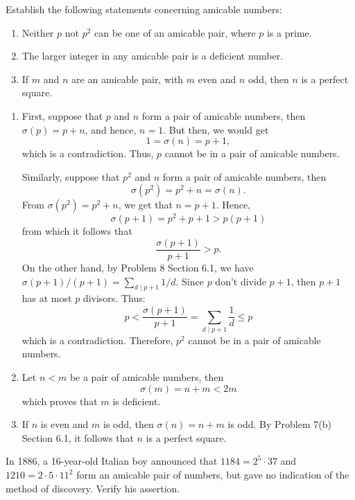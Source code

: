 \begin{exercise}
    Establish the following statements concerning amicable numbers:
    \begin{enumerate}
        \item Neither $p$ not $p^2$ can be one of an amicable pair, where $p$ is a prime.
        \item The larger integer in any amicable pair is a deficient number.
        \item If $m$ and $n$ are an amicable pair, with $m$ even and $n$ odd, then $n$ is a perfect square.  \\
    \end{enumerate}
\end{exercise}

\begin{solution}
    \begin{enumerate}
        \item First, suppose that $p$ and $n$ form a pair of amicable numbers, then
        $\sigma(p) = p + n$, and hence, $n = 1$. But then, we would get
        $$1 = \sigma(n) = p+1,$$
        which is a contradiction. Thus, $p$ cannot be in a pair of amicable numbers.

        Similarly, suppose that $p^2$ and $n$ form a pair of amicable numbers, then
        $$\sigma(p^2) = p^2 + n = \sigma(n).$$
        From $\sigma(p^2) = p^2 + n$, we get that $n = p+1$. Hence,
        $$\sigma(p + 1) = p^2 + p + 1 >p(p+1)$$
        from which it follows that
        $$\frac{\sigma(p+1)}{p+1} > p.$$
        On the other hand, by Problem 8 Section 6.1, we have $\sigma(p+1)/(p+1) = \sum_{d \mid p+1}1/d$. Since $p$ don't divide $p+1$, then $p+1$ has at most $p$ divisors. Thus:
        $$p < \frac{\sigma(p+1)}{p+1} = \sum_{d \mid p+1}\frac{1}{d} \leq p$$
        which is a contradiction. Therefore, $p^2$ cannot be in a pair of amicable numbers.
        \item Let $n < m$ be a pair of amicable numbers, then
        $$\sigma(m) = n + m < 2m$$
        which proves that $m$ is deficient.
        \item If $n$ is even and $m$ is odd, then $\sigma(n) = n+m$ is odd. By Problem 7(b) Section 6.1, it follows that $n$ is a perfect square. \\
    \end{enumerate}
\end{solution}

\begin{exercise}
    In 1886, a 16-year-old Italian boy announced that $1184 = 2^5\cdot 37$ and $1210 = 2\cdot 5 \cdot 11^2$ form an amicable pair of numbers, but gave no indication of the method of discovery. Verify his assertion. \\
\end{exercise}

